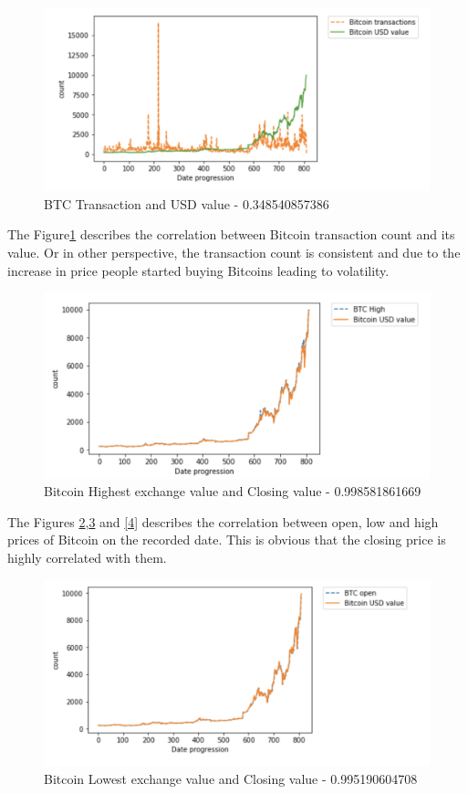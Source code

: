 \documentclass[sigconf]{acmart}
\begin{document}
\begin{figure}[!ht]
  \centering\includegraphics[width=\columnwidth]{images/BTC-prcvsBTC-trans.png}
  \caption{BTC Transaction and USD value - 0.348540857386 }
  \label{1}
\end{figure}

The Figure\ref{1} describes the correlation between Bitcoin transaction count and its value. Or in other perspective, the transaction count is consistent and due to the increase in price people started buying Bitcoins leading to volatility.

\begin{figure}[!ht]
  \centering\includegraphics[width=\columnwidth]{images/High.png}
  \caption{Bitcoin Highest exchange value and Closing value - 0.998581861669  }
  \label{2}
\end{figure}

The Figures \ref{2},\ref{3} and \ref{4} describes the correlation between open, low and high prices of Bitcoin on the recorded date. This is obvious that the closing price is highly correlated with them.

\begin{figure}[!ht]
  \centering\includegraphics[width=\columnwidth]{images/Open.png}
  \caption{Bitcoin Lowest exchange value and Closing value - 0.995190604708  }
  \label{3}
\end{figure}
\end{document}
